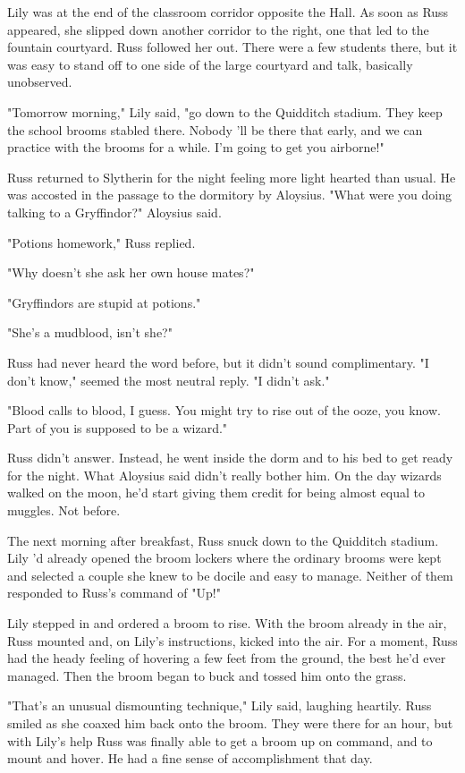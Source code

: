 Lily was at the end of the classroom corridor opposite the Hall. As soon as Russ appeared, she slipped down another corridor to the right, one that led to the fountain courtyard. Russ followed her out. There were a few students there, but it was easy to stand off to one side of the large courtyard and talk, basically unobserved.

"Tomorrow morning," Lily said, "go down to the Quidditch stadium. They keep the school brooms stabled there. Nobody 'll be there that early, and we can practice with the brooms for a while. I'm going to get you airborne!"

Russ returned to Slytherin for the night feeling more light hearted than usual. He was accosted in the passage to the dormitory by Aloysius. "What were you doing talking to a Gryffindor?" Aloysius said.

"Potions{\el} homework," Russ replied.

"Why doesn't she ask her own house mates?"

"Gryffindors are{\el} stupid at potions."

"She's a mudblood, isn't she?"

Russ had never heard the word before, but it didn't sound complimentary. "I don't know," seemed the most neutral reply. "I didn't{\el} ask."

"Blood calls to blood, I guess. You might try to rise out of the ooze, you know. Part of you is supposed to be a wizard."

Russ didn't answer. Instead, he went inside the dorm and to his bed to get ready for the night. What Aloysius said didn't really bother him. On the day wizards walked on the moon, he'd start giving them credit for being almost equal to muggles. Not before.

The next morning after breakfast, Russ snuck down to the Quidditch stadium. Lily 'd already opened the broom lockers where the ordinary brooms were kept and selected a couple she knew to be docile and easy to manage. Neither of them responded to Russ's command of "Up!"

Lily stepped in and ordered a broom to rise. With the broom already in the air, Russ mounted and, on Lily's instructions, kicked into the air. For a moment, Russ had the heady feeling of hovering a few feet from the ground, the best he'd ever managed. Then the broom began to buck and tossed him onto the grass.

"That's an unusual dismounting technique," Lily said, laughing heartily. Russ smiled as she coaxed him back onto the broom. They were there for an hour, but with Lily's help Russ was finally able to get a broom up on command, and to mount and hover. He had a fine sense of accomplishment that day.

